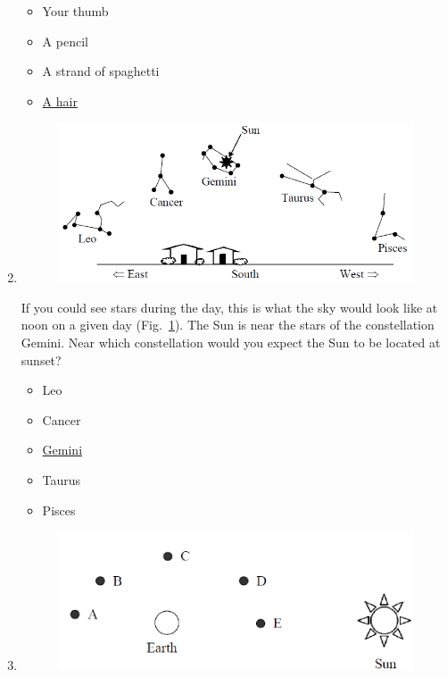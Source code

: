 \documentclass[12pt]{article}
\begin{document}
\begin{enumerate}
\begin{itemize}
    \item Your thumb
    \item A pencil
    \item A strand of spaghetti
    \item \underline{A hair}
\end{itemize}
\item
\begin{figure}[htbp]
    \centering
    \includegraphics{asq8.png}
    \caption{}
    \label{fig:asq8}
\end{figure}
If you could see stars during the day, this is what the sky would look like at noon on a given day (Fig.~\ref{fig:asq8}). The Sun is near the stars of the constellation Gemini. Near which constellation would you expect the Sun to be located at sunset?
\begin{itemize}
    \item Leo
    \item Cancer
    \item \underline{Gemini}
    \item Taurus
    \item Pisces
\end{itemize}
\item
\begin{figure}[htbp]
    \centering
    \includegraphics{asq9a.png}
    \caption{}
    \label{fig:asq9a}
\end{figure}
\begin{figure}[htbp]

\end{figure}
\end{enumerate}
\end{document}
